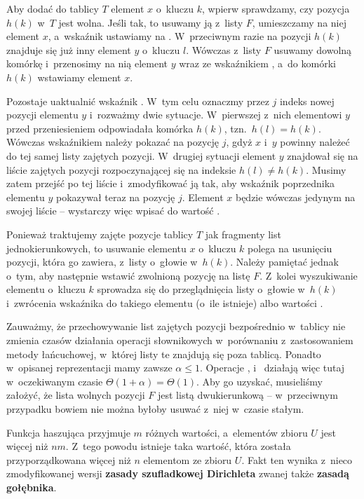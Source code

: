 Aby dodać do tablicy $T$ element $x$ o~kluczu $k$, wpierw sprawdzamy, czy pozycja $h(k)$ w~$T$ jest wolna.
Jeśli tak, to usuwamy ją z~listy $F$, umieszczamy na niej element $x$, a~wskaźnik  ustawiamy na .
W~przeciwnym razie na pozycji $h(k)$ znajduje się już inny element $y$ o~kluczu $l$.
Wówczas z~listy $F$ usuwamy dowolną komórkę i~przenosimy na nią element $y$ wraz ze wskaźnikiem , a~do komórki $h(k)$ wstawiamy element $x$.

Pozostaje uaktualnić wskaźnik .
W~tym celu oznaczmy przez $j$ indeks nowej pozycji elementu $y$ i~rozważmy dwie sytuacje.
W~pierwszej z~nich elementowi $y$ przed przeniesieniem odpowiadała komórka $h(k)$, tzn.\ $h(l)=h(k)$.
Wówczas wskaźnikiem  należy pokazać na pozycję $j$, gdyż $x$ i~$y$ powinny należeć do tej samej listy zajętych pozycji.
W~drugiej sytuacji element $y$ znajdował się na liście zajętych pozycji rozpoczynającej się na indeksie $h(l)\ne h(k)$.
Musimy zatem przejść po tej liście i~zmodyfikować ją tak, aby wskaźnik  poprzednika elementu $y$ pokazywał teraz na pozycję $j$.
Element $x$ będzie wówczas jedynym na swojej liście -- wystarczy więc wpisać do  wartość .

Ponieważ traktujemy zajęte pozycje tablicy $T$ jak fragmenty list jednokierunkowych, to usuwanie elementu $x$ o~kluczu $k$ polega na usunięciu pozycji, która go zawiera, z~listy o~głowie w~$h(k)$.
Należy pamiętać jednak o~tym, aby następnie wstawić zwolnioną pozycję na listę $F$.
Z~kolei wyszukiwanie elementu o~kluczu $k$ sprowadza się do przeglądnięcia listy o~głowie w~$h(k)$ i~zwrócenia wskaźnika do takiego elementu (o~ile istnieje) albo wartości .

Zauważmy, że przechowywanie list zajętych pozycji bezpośrednio w~tablicy nie zmienia czasów działania operacji słownikowych w~porównaniu z~zastosowaniem metody łańcuchowej, w~której listy te znajdują się poza tablicą.
Ponadto w~opisanej reprezentacji mamy zawsze $\alpha\le1$.
Operacje ,  i~ działają więc tutaj w~oczekiwanym czasie $\Theta(1+\alpha)=\Theta(1)$.
Aby go uzyskać, musieliśmy założyć, że lista wolnych pozycji $F$ jest listą dwukierunkową -- w~przeciwnym przypadku bowiem nie można byłoby usuwać z~niej w~czasie stałym.

\exercise %
Funkcja haszująca przyjmuje $m$ różnych wartości, a~elementów zbioru $U$ jest więcej niż $nm$.
Z~tego powodu istnieje taka wartość, która została przyporządkowana więcej niż $n$ elementom ze zbioru $U$.
Fakt ten wynika z~nieco zmodyfikowanej wersji \textbf{zasady szufladkowej Dirichleta} \cite{pigeonholeprinciple} zwanej także \textbf{zasadą gołębnika}.

